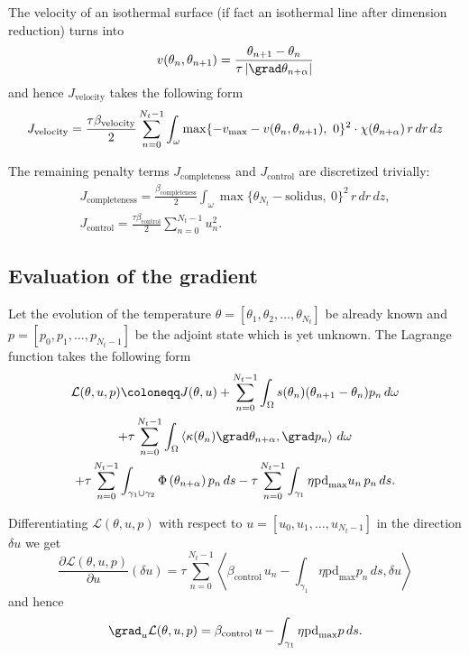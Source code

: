 The velocity of an isothermal surface (if fact an isothermal line after dimension reduction) turns into
\begin{equation}
	v(\theta_n, \theta_{n+1}) = \frac{\theta_{n+1}-\theta_n}{\tau \left|\grad \theta_{n+\alpha} \right|}
\end{equation}
and hence $J_\text{velocity}$ takes the following form
\begin{equation}
	J_\text{velocity} =
	\frac{\tau \beta_\text{velocity}}{2}
	\sum_{n=0}^{N_t-1} \int_{\omega} \max \{ - v_{\max} - v(\theta_n, \theta_{n+1}),\ 0 \}^2 \cdot \chi(\theta_{n+\alpha})\, r\, dr\, dz\, \\
\end{equation}

The remaining penalty terms $J_\text{completeness}$ and $J_\text{control}$ are discretized trivially:
\begin{eqnarray}
	J_\text{completeness} =
	\frac{\beta_\text{completeness}}{2} \int_{\omega} \max\{ \theta_{N_t} - \text{solidus},\ 0 \}^2\, r\, dr\, dz, \\
	J_{\text{control}} =
	\frac{\tau \beta_\text{control}}{2} \sum_{n=0}^{N_t-1} u_n^2.
\end{eqnarray}


\subsection{Evaluation of the gradient}


Let the evolution of the temperature $\theta = [\theta_1, \theta_2, \ldots, \theta_{N_t}]$ be already known and $p = [p_0, p_1, \ldots, p_{N_t-1}]$ be the adjoint state which is yet unknown.
The Lagrange function takes the following form
\begin{multline} \label{eq:lagrange}
	\mathcal{L}(\theta,u,p) \coloneqq
	J(\theta,u)
	+
	\sum_{n=0}^{N_t-1}\int_{\Omega}
		s(\theta_n) (\theta_{n+1}-\theta_n) p_n\, d\omega \\
	+ \tau
	\sum_{n=0}^{N_t-1}\int_{\Omega}
		\left\langle \kappa(\theta_n) \grad \theta_{n+\alpha}, \grad p_n \right\rangle\, d\omega \\
	+ \tau
	\sum_{n=0}^{N_t-1}\int_{\gamma_1 \cup \gamma_2}
		\Phi \left( \theta_{n+\alpha} \right) p_n\, ds
	- \tau
	\sum_{n=0}^{N_t-1}\int_{\gamma_1}
		\eta \text{pd}_{\max} u_n\, p_n\, ds.
\end{multline}

Differentiating $\mathcal{L}(\theta,u,p)$ with respect to $u = [u_0, u_1, \ldots, u_{N_t-1}]$ in the direction $\delta u$ we get
\begin{equation}
	\frac{\partial \mathcal{L}(\theta,u,p)}{\partial u} (\delta u)
	=
	\tau \sum_{n=0}^{N_t-1}
	\left\langle
		\beta_\text{control}\, u_n - \int_{\gamma_1} \eta \text{pd}_{\max} p_n\, ds, \delta u
	\right\rangle
\end{equation}
and hence
\begin{equation} \label{eq:gradient}
	\grad_u \mathcal{L}(\theta, u, p) = \beta_\text{control}\, u - \int_{\gamma_1} \eta \text{pd}_{\max} p\, ds.
\end{equation}

